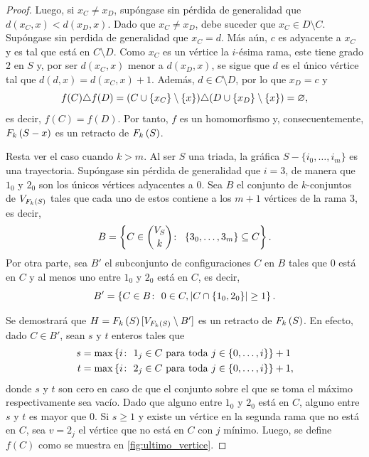 \begin{proof}
    Luego, si $x_C\neq x_D$, sup\'ongase sin p\'erdida de generalidad que
    $d(x_C,x) < d(x_D,x)$. Dado que $x_C\neq x_D$, debe suceder que $x_C\in
    D\setminus C$. Sup\'ongase sin perdida de generalidad que $x_C=d$. M\'as
    a\'un, $c$ es adyacente a $x_C$ y es tal que est\'a en $C\setminus D$. Como
    $x_C$ es un v\'ertice la $i$-\'esima rama, este tiene grado $2$ en $S$ y,
    por ser $d(x_C,x)$ menor a $d(x_D,x)$, se sigue que $d$ es el \'unico
    v\'ertice tal que $d(d,x)=d(x_C,x)+1$. Adem\'as, $d\in C\setminus D$, por lo
    que $x_D=c$ y
    \[
        f(C)\triangle f(D)= (C\cup\left\{ x_C\right\}\setminus \left\{ x\right\})\triangle(D\cup\left\{ x_D\right\}
    \setminus \left\{ x\right\}) = \varnothing,
    \]
    es decir, $f(C)=f(D)$. Por tanto, $f$ es un homomorfismo y,
    consecuentemente, $F_{k}\left( S-x\right)$ es un retracto de $F_{k}\left( S\right)$.
    
    Resta ver el caso cuando $k>m$.  Al ser $S$ una triada, la gr\'afica
    $S-\{i_0, \dots, i_m\}$ es una trayectoria. Sup\'ongase sin p\'erdida de
    generalidad que $i=3$, de manera que $1_0$ y $2_0$ son los \'unicos
    v\'ertices adyacentes a $0$. Sea $B$ el conjunto de $k$-conjuntos de
    $V_{F_{k}\left( S\right)}$ tales que cada uno de estos contiene a los $m+1$ v\'ertices
    de la rama $3$, es decir,
    \[
        B=\left\{ C\in \binom{V_S}{k}\colon\  \left\{ 3_0,\dots,3_m\right\}\subseteq C\right\}.
    \]
    Por otra parte, sea $B'$ el subconjunto de configuraciones $C$ en $B$ tales
    que $0$ est\'a en $C$ y al menos uno entre $1_0$ y $2_0$ est\'a en $C$, es
    decir,
    \[
        B' = \left\{ C\in B\colon\  0\in C, \left|C\cap \left\{ 1_0,2_0\right\}\right|\geq 1\right\}.
    \]

    Se demostrar\'a que $H=F_{k}\left( S\right)[V_{F_{k}\left( S\right)}\setminus B']$ es un retracto de
    $F_{k}\left( S\right)$. En efecto, dado $C\in B'$, sean $s$ y $t$ enteros tales que
    \begin{align*}
        s &=\max\left\{ i\colon\  1_j\in C \text{ para toda } j\in\{0,\dots, i\}\right\}+1 \\
        t &=\max\left\{ i\colon\  2_j\in C \text{ para toda } j\in\{0,\dots, i\}\right\}+1,
    \end{align*}
    donde $s$ y $t$ son cero en caso de que el conjunto sobre el que se toma el
    m\'aximo respectivamente sea vac\'io. Dado que alguno entre $1_0$ y $2_0$
    est\'a en $C$, alguno entre $s$ y $t$ es mayor que $0$. Si $s\geq 1$ y
    existe un v\'ertice en la segunda rama que no est\'a en $C$, sea $v=2_j$ el
    v\'ertice que no est\'a en $C$ con $j$ m\'inimo. Luego, se define $f(C)$
    como se muestra en \cref{fig:ultimo_vertice}.


\end{proof}
